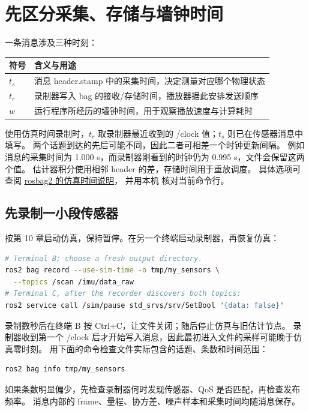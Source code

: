 \section{先区分采集、存储与墙钟时间}
一条消息涉及三种时刻：
\begin{center}\small
\begin{tabular}{lp{10cm}}\toprule
符号 & 含义与用途\\\midrule
$t_s$ & 消息 header.stamp 中的采集时间，决定测量对应哪个物理状态\\
$t_r$ & 录制器写入 bag 的接收/存储时间，播放器据此安排发送顺序\\
$w$ & 运行程序所经历的墙钟时间，用于观察播放速度与计算耗时\\\bottomrule
\end{tabular}
\end{center}
使用仿真时间录制时，$t_r$ 取录制器最近收到的 /clock 值；$t_s$ 则已在传感器消息中填写。
两个话题到达的先后可能不同，因此二者可相差一个时钟更新间隔。
例如消息的采集时间为 1.000 s，而录制器刚看到的时钟仍为 0.995 s，文件会保留这两个值。
估计器积分使用相邻 header 的差，存储时间用于重放调度。
具体选项可查阅 \href{https://github.com/ros2/rosbag2#simulation-time}{rosbag2 的仿真时间说明}，
并用本机  核对当前命令行。

\subsection{先录制一小段传感器}
按第 10 章启动仿真，保持暂停。在另一个终端启动录制器，再恢复仿真：
\begin{lstlisting}[language=bash,numbers=none]
# Terminal B; choose a fresh output directory.
ros2 bag record --use-sim-time -o tmp/my_sensors \
  --topics /scan /imu/data_raw
# Terminal C, after the recorder discovers both topics:
ros2 service call /sim/pause std_srvs/srv/SetBool "{data: false}"
\end{lstlisting}
录制数秒后在终端 B 按 Ctrl+C，让文件关闭；随后停止仿真与旧估计节点。
录制器收到第一个 /clock 后才开始写入消息，因此最初进入文件的采样可能晚于仿真零时刻。
用下面的命令检查文件实际包含的话题、条数和时间范围：
\begin{lstlisting}[language=bash,numbers=none]
ros2 bag info tmp/my_sensors
\end{lstlisting}
如果条数明显偏少，先检查录制器何时发现传感器、QoS 是否匹配，再检查发布频率。
消息内部的 frame、量程、协方差、噪声样本和采集时间均随消息保存。


